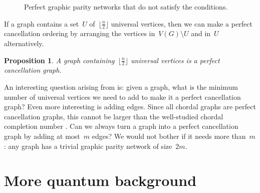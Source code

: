 \documentclass[a4paper,cleveref, autoref, 11pt, fleqn, thm-restate]{article}
\theoremstyle{plain}
\newtheorem{proposition}[theorem]{Proposition}
\renewcommand{\ket}[1]{\{#1\}}
\begin{document}
\begin{figure}[ht!]
  \caption{Perfect graphic parity networks that do not satisfy the conditions.}
  \label{fig:bad-examples}
\end{figure}





If a graph contains a set~$U$ of~$\lfloor \frac{n}{2}\rfloor$ universal vertices, then we can make a perfect cancellation ordering by arranging the vertices in~$V(G)\setminus U$ and in~$U$ alternatively.

\begin{proposition}\label{lem:universal}
  A graph containing~$\lfloor \frac{n}{2}\rfloor$ universal vertices is a perfect cancellation graph.
\end{proposition}

An interesting question arising from  is: given a graph, what is the minimum number of universal vertices we need to add to make it a perfect cancellation graph?
Even more interesting is adding edges.  Since all chordal graphs are perfect cancellation graphs, this cannot be larger than the well-studied chordal completion number \cite{cai-96-hereditary-graph-modification, kaplan-99-chordal-completion}.  Can we always turn a graph into a perfect cancellation graph by adding at most~$m$ edges?  We would not bother if it needs more than~$m$: any graph has a trivial graphic parity network of size~$2 m$.



\newpage

\appendix

















\section{More quantum background}\label{app:quantum-intro}






\renewcommand{\ket}[1]{|#1\rangle}
\end{document}
